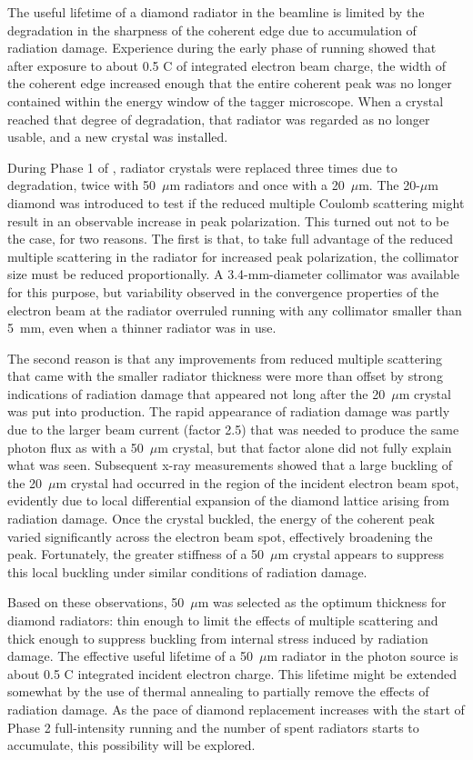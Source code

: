 The useful lifetime of a diamond radiator in the \GX{} beamline is limited by the 
degradation in the sharpness of the coherent edge due to accumulation of radiation damage.
Experience during the early phase of \GX{} running showed that after exposure to
about 0.5 C of integrated electron beam charge, the width of the coherent edge 
increased enough that the entire coherent peak was no longer contained within the energy
window of the tagger microscope. When a crystal reached that degree of degradation, that
radiator was regarded as no longer usable, and a new crystal was installed.

During Phase 1 of \GX{}, radiator crystals were replaced three times due
to degradation, twice with 50~$\mu$m radiators and once with a 20~$\mu$m. The 20-$\mu$m
diamond was introduced to test if the reduced multiple Coulomb scattering 
might result in an
observable increase in peak polarization. This turned out not to be the case, for
two reasons. The first is that, to take full advantage of the reduced multiple
scattering in the radiator for increased peak polarization, the collimator size 
must be reduced proportionally. A 3.4-mm-diameter collimator was available for
this purpose, but variability observed in the convergence properties of the electron
beam at the radiator overruled running with any collimator smaller than 5~mm,
even when a thinner radiator was in use.

The second reason is that any improvements
from reduced multiple scattering that came with the smaller radiator thickness
were more than offset by strong indications of radiation
damage that appeared not long after the 20~$\mu$m crystal was put into production.
The rapid appearance of radiation damage 
was partly due to the larger beam current (factor 2.5) that was needed to
produce the same photon flux as with a 50~$\mu$m crystal, but that factor alone
did not fully
explain what was seen. Subsequent x-ray measurements showed that a large buckling of
the 20~$\mu$m crystal had occurred in the region of the incident electron beam spot, 
evidently due to  local differential expansion of the diamond lattice arising from
radiation damage. Once the crystal buckled, the energy of the coherent
peak varied significantly across the electron beam spot, effectively broadening
the peak. Fortunately, the greater stiffness of a 50~$\mu$m crystal
appears to suppress this local buckling under similar conditions of radiation damage.

Based on these observations, 50~$\mu$m was selected as the
optimum thickness for \GX{} diamond radiators: thin enough to limit the effects
of multiple scattering and thick enough to suppress buckling from internal stress
induced by radiation damage. The effective useful lifetime of a 50~$\mu$m radiator
in the photon source is about 0.5 C integrated incident electron charge. 
This lifetime might be extended somewhat by the use of thermal annealing to partially remove the effects of radiation damage. As the pace of diamond replacement increases with the start of \GX{} Phase 2 full-intensity running and the number of spent radiators
starts to accumulate, this possibility will be explored.

